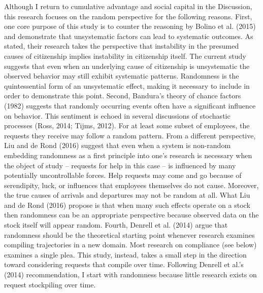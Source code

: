\documentclass[english,,man]{apa6}
\begin{document}
Although I return to cumulative advantage and social capital in the Discussion, this research focuses on the random perspective for the following reasons. First, one core purpose of this study is to counter the reasoning by Bolino et al. (2015) and demonstrate that unsystematic factors can lead to systematic outcomes. As stated, their research takes the perspective that instability in the presumed causes of citizenship implies instability in citizenship itself. The current study suggests that even when an underlying cause of citizenship is unsystematic the observed behavior may still exhibit systematic patterns. Randomness is the quintessential form of an unsystematic effect, making it necessary to include in order to demonstrate this point. Second, Bandura's theory of chance factors (1982) suggests that randomly occurring events often have a significant influence on behavior. This sentiment is echoed in several discussions of stochastic processes (Ross, 2014; Tijms, 2012). For at least some subset of employees, the requests they receive may follow a random pattern. From a different perspective, Liu and de Rond (2016) suggest that even when a system is non-random embedding randomness as a first principle into one's research is necessary when the object of study -- requests for help in this case -- is influenced by many potentially uncontrollable forces. Help requests may come and go because of serendipity, luck, or influences that employees themselves do not cause. Moreover, the true causes of arrivals and departures may not be random at all. What Liu and de Rond (2016) propose is that when many such effects operate on a stock then randomness can be an appropriate perspective because observed data on the stock itself will appear random. Fourth, Denrell et al. (2014) argue that randomness should be the theoretical starting point whenever research examines compiling trajectories in a new domain. Most research on compliance (see below) examines a single plea. This study, instead, takes a small step in the direction toward considering requests that compile over time. Following Denrell et al.'s (2014) recommendation, I start with randomness because little research exists on request stockpiling over time.
\end{document}
